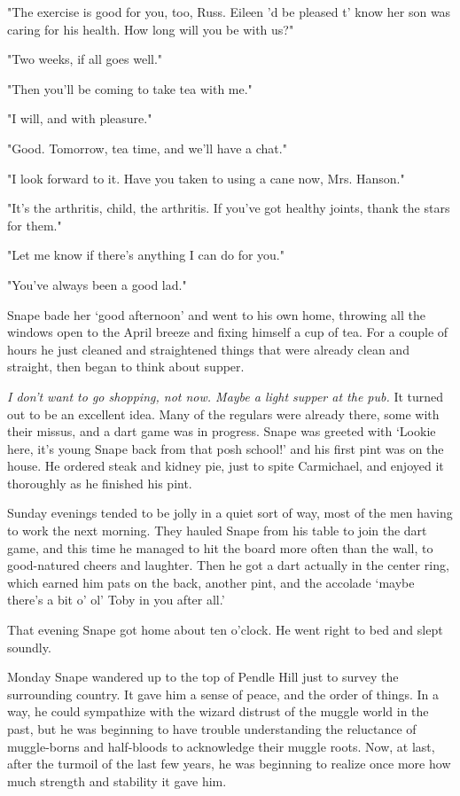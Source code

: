 "The exercise is good for you, too, Russ. Eileen 'd be pleased t' know her son was caring for his health. How long will you be with us?"

"Two weeks, if all goes well."

"Then you'll be coming to take tea with me."

"I will, and with pleasure."

"Good. Tomorrow, tea time, and we'll have a chat."

"I look forward to it. Have you taken to using a cane now, Mrs. Hanson."

"It's the arthritis, child, the arthritis. If you've got healthy joints, thank the stars for them."

"Let me know if there's anything I can do for you."

"You've always been a good lad."

Snape bade her `good afternoon' and went to his own home, throwing all the windows open to the April breeze and fixing himself a cup of tea. For a couple of hours he just cleaned and straightened things that were already clean and straight, then began to think about supper.

\emph{I don't want to go shopping, not now. Maybe a light supper at the pub.} It turned out to be an excellent idea. Many of the regulars were already there, some with their missus, and a dart game was in progress. Snape was greeted with `Lookie here, it's young Snape back from that posh school!' and his first pint was on the house. He ordered steak and kidney pie, just to spite Carmichael, and enjoyed it thoroughly as he finished his pint.

Sunday evenings tended to be jolly in a quiet sort of way, most of the men having to work the next morning. They hauled Snape from his table to join the dart game, and this time he managed to hit the board more often than the wall, to good-natured cheers and laughter. Then he got a dart actually in the center ring, which earned him pats on the back, another pint, and the accolade `maybe there's a bit o' ol' Toby in you after all.'

That evening Snape got home about ten o'clock. He went right to bed and slept soundly.

Monday Snape wandered up to the top of Pendle Hill just to survey the surrounding country. It gave him a sense of peace, and the order of things. In a way, he could sympathize with the wizard distrust of the muggle world in the past, but he was beginning to have trouble understanding the reluctance of muggle-borns and half-bloods to acknowledge their muggle roots. Now, at last, after the turmoil of the last few years, he was beginning to realize once more how much strength and stability it gave him.

